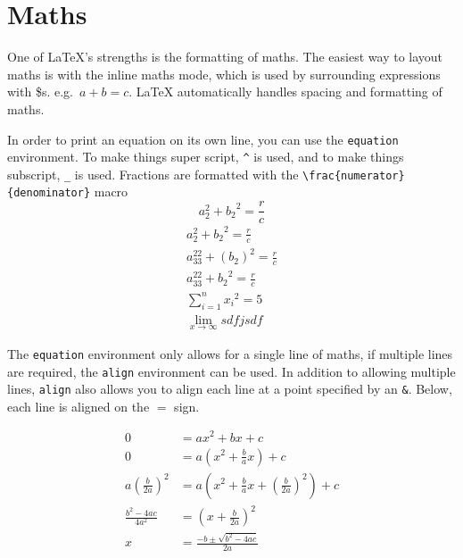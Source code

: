 \documentclass[11pt, twoside]{article}
\begin{document}
\section{Maths}

One of \LaTeX{}'s strengths is the formatting of maths. The easiest way to layout maths is with the inline maths mode, which is used by surrounding expressions with \$s. e.g.\ \(a + b = c\). \LaTeX{} automatically handles spacing and formatting of maths.

In order to print an equation on its own line, you can use the \lstinline{equation} environment. To make things super script, \lstinline{^} is used, and to make things subscript, \lstinline{_} is used. Fractions are formatted with the \lstinline|\frac{numerator}{denominator}| macro
\begin{equation}
    a^2_2 + {b_2}^2  = \frac{r}{c}
\end{equation}
\begin{align}
    a^2_2 + {b_2}^2  = \frac{r}{c}       \\
    a^{22}_{33} + (b_2)^2  = \frac{r}{c} \\
    a^{22}_{33} + {b_2}^2  = \frac{r}{c} \\
    \sum_{i=1}^{n} {x_i}^2 = 5           \\
    \lim_{x\rightarrow\infty} sdfjsdf
\end{align}

The \lstinline{equation} environment only allows for a single line of maths, if multiple lines are required, the \lstinline{align} environment can be used. In addition to allowing multiple lines, \lstinline{align} also allows you to align each line at a point specified by an \lstinline{&}. Below, each line is aligned on the \(=\) sign.

\begin{align}
    0                               & = ax^2 + bx + c \nonumber                                                           \\
    0                               & = a(x^2 + \frac{b}{a}x) + c \nonumber                                               \\
    a \left( \frac{b}{2a} \right)^2 & = a \left( x^2 + \frac{b}{a}x + \left( \frac{b}{2a} \right)^2 \right) + c \nonumber \\
    \frac{b^2-4ac}{4a^2}            & = \left( x +\frac{b}{2a} \right)^2 \nonumber                                        \\
    x                               & = \frac{-b \pm \sqrt{b^2 - 4ac}}{2a}
\end{align}
\end{document}
